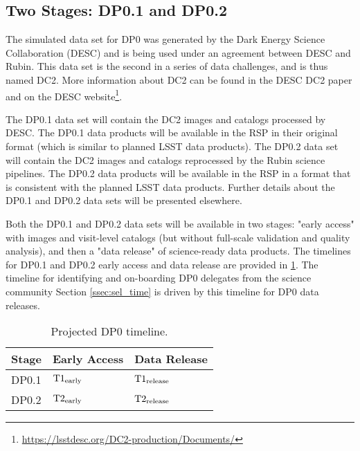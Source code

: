 \documentclass[DM,lsstdraft,authoryear,toc]{lsstdoc}
\begin{document}
\subsection{Two Stages: DP0.1 and DP0.2}\label{ssec:intro_stages}

The simulated data set for DP0 was generated by the Dark Energy Science Collaboration (DESC) and is being used under an agreement between DESC and Rubin.
This data set is the second in a series of data challenges, and is thus named DC2.
More information about DC2 can be found in the DESC DC2 paper \citep{2020arXiv201005926L} and on the DESC website\footnote{\url{https://lsstdesc.org/DC2-production/Documents/}}.

The DP0.1 data set will contain the DC2 images and catalogs processed by DESC.
The DP0.1 data products will be available in the RSP in their original format (which is similar to planned LSST data products).
The DP0.2 data set will contain the DC2 images and catalogs reprocessed by the Rubin science pipelines.
The DP0.2 data products will be available in the RSP in a format that is consistent with the planned LSST data products.
Further details about the DP0.1 and DP0.2 data sets will be presented elsewhere.

Both the DP0.1 and DP0.2 data sets will be available in two stages: "early access" with images and visit-level catalogs (but without full-scale validation and quality analysis), and then a "data release" of science-ready data products. 
The timelines for DP0.1 and DP0.2 early access and data release are provided in \ref{tab:dp0_timeline}. The timeline for identifying and on-boarding DP0 delegates from the science community Section \ref{ssec:sel_time} is driven by this timeline for DP0 data releases.

\begin{table}[!h]
\centering
\caption{Projected DP0 timeline.}\label{tab:dp0_timeline}
\begin{tabular}{lll}
\hline
Stage & Early Access & Data Release \\
\hline \hline
DP0.1 & $\rm{T1_{early}}$ & $\rm{T1_{release}}$ \\
DP0.2 & $\rm{T2_{early}}$ & $\rm{T2_{release}}$ \\
\hline
\end{tabular}
\end{table}
\end{document}
